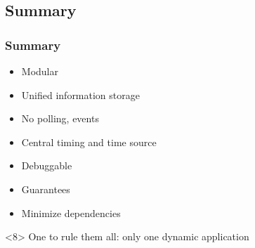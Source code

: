 \subsection{Summary}
\begin{frame}
  \frametitle{Summary}
  \begin{itemize}[<+->]
  \item Modular
  \item Unified information storage
  \item No polling, events
  \item Central timing and time source
  \item Debuggable
  \item Guarantees
  \item Minimize dependencies
  \end{itemize}
  \begin{block}<8>{}
    \centering
    One to rule them all: only one dynamic application
  \end{block}
\end{frame}

